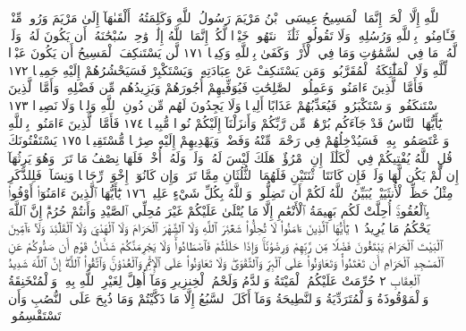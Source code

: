 ٱللَّهِ إِلَّا ٱلْحَقَّۚ إِنَّمَا ٱلْمَسِيحُ عِيسَى ٱبْنُ مَرْيَمَ رَسُولُ ٱللَّهِ
وَكَلِمَتُهُۥٓ أَلْقَىٰهَآ إِلَىٰ مَرْيَمَ وَرُوحࣱ مِّنْهُۖ فَـَٔامِنُوا۟ بِٱللَّهِ
وَرُسُلِهِۦۖ وَلَا تَقُولُوا۟ ثَلَٰثَةٌۚ ٱنتَهُوا۟ خَيْرࣰا لَّكُمْۚ إِنَّمَا ٱللَّهُ
إِلَٰهࣱ وَٰحِدࣱۖ سُبْحَٰنَهُۥٓ أَن يَكُونَ لَهُۥ وَلَدࣱۘ لَّهُۥ مَا فِي ٱلسَّمَٰوَٰتِ
وَمَا فِي ٱلْأَرْضِۗ وَكَفَىٰ بِٱللَّهِ وَكِيلࣰا ١٧١ لَّن يَسْتَنكِفَ
ٱلْمَسِيحُ أَن يَكُونَ عَبْدࣰا لِّلَّهِ وَلَا ٱلْمَلَٰٓئِكَةُ ٱلْمُقَرَّبُونَۚ
وَمَن يَسْتَنكِفْ عَنْ عِبَادَتِهِۦ وَيَسْتَكْبِرْ فَسَيَحْشُرُهُمْ
إِلَيْهِ جَمِيعࣰا ١٧٢ فَأَمَّا ٱلَّذِينَ ءَامَنُوا۟ وَعَمِلُوا۟ ٱلصَّٰلِحَٰتِ
فَيُوَفِّيهِمْ أُجُورَهُمْ وَيَزِيدُهُم مِّن فَضْلِهِۦۖ وَأَمَّا ٱلَّذِينَ
ٱسْتَنكَفُوا۟ وَٱسْتَكْبَرُوا۟ فَيُعَذِّبُهُمْ عَذَابًا أَلِيمࣰا وَلَا
يَجِدُونَ لَهُم مِّن دُونِ ٱللَّهِ وَلِيࣰّا وَلَا نَصِيرࣰا ١٧٣ يَٰٓأَيُّهَا ٱلنَّاسُ
قَدْ جَآءَكُم بُرْهَٰنࣱ مِّن رَّبِّكُمْ وَأَنزَلْنَآ إِلَيْكُمْ نُورࣰا مُّبِينࣰا ١٧٤
فَأَمَّا ٱلَّذِينَ ءَامَنُوا۟ بِٱللَّهِ وَٱعْتَصَمُوا۟ بِهِۦ فَسَيُدْخِلُهُمْ فِي
رَحْمَةࣲ مِّنْهُ وَفَضْلࣲ وَيَهْدِيهِمْ إِلَيْهِ صِرَٰطࣰا مُّسْتَقِيمࣰا ١٧٥
يَسْتَفْتُونَكَ قُلِ ٱللَّهُ يُفْتِيكُمْ فِي ٱلْكَلَٰلَةِۚ إِنِ ٱمْرُؤٌا۟ هَلَكَ
لَيْسَ لَهُۥ وَلَدࣱ وَلَهُۥٓ أُخْتࣱ فَلَهَا نِصْفُ مَا تَرَكَۚ وَهُوَ يَرِثُهَآ إِن
لَّمْ يَكُن لَّهَا وَلَدࣱۚ فَإِن كَانَتَا ٱثْنَتَيْنِ فَلَهُمَا ٱلثُّلُثَانِ مِمَّا تَرَكَۚ
وَإِن كَانُوٓا۟ إِخْوَةࣰ رِّجَالࣰا وَنِسَآءࣰ فَلِلذَّكَرِ مِثْلُ حَظِّ ٱلْأُنثَيَيْنِۗ
يُبَيِّنُ ٱللَّهُ لَكُمْ أَن تَضِلُّوا۟ۗ وَٱللَّهُ بِكُلِّ شَيْءٍ عَلِيمُۢ ١٧٦
يَٰٓأَيُّهَا ٱلَّذِينَ ءَامَنُوٓا۟ أَوْفُوا۟ بِٱلْعُقُودِۚ أُحِلَّتْ لَكُم بَهِيمَةُ ٱلْأَنْعَٰمِ
إِلَّا مَا يُتْلَىٰ عَلَيْكُمْ غَيْرَ مُحِلِّي ٱلصَّيْدِ وَأَنتُمْ حُرُمٌۗ إِنَّ ٱللَّهَ
يَحْكُمُ مَا يُرِيدُ ١ يَٰٓأَيُّهَا ٱلَّذِينَ ءَامَنُوا۟ لَا تُحِلُّوا۟ شَعَٰٓئِرَ ٱللَّهِ
وَلَا ٱلشَّهْرَ ٱلْحَرَامَ وَلَا ٱلْهَدْيَ وَلَا ٱلْقَلَٰٓئِدَ وَلَآ ءَآمِّينَ ٱلْبَيْتَ
ٱلْحَرَامَ يَبْتَغُونَ فَضْلࣰا مِّن رَّبِّهِمْ وَرِضْوَٰنࣰاۚ وَإِذَا حَلَلْتُمْ فَٱصْطَادُوا۟ۚ
وَلَا يَجْرِمَنَّكُمْ شَنَـَٔانُ قَوْمٍ أَن صَدُّوكُمْ عَنِ ٱلْمَسْجِدِ ٱلْحَرَامِ أَن
تَعْتَدُوا۟ۘ وَتَعَاوَنُوا۟ عَلَى ٱلْبِرِّ وَٱلتَّقْوَىٰۖ وَلَا تَعَاوَنُوا۟ عَلَى ٱلْإِثْمِ
وَٱلْعُدْوَٰنِۚ وَٱتَّقُوا۟ ٱللَّهَۖ إِنَّ ٱللَّهَ شَدِيدُ ٱلْعِقَابِ ٢
حُرِّمَتْ عَلَيْكُمُ ٱلْمَيْتَةُ وَٱلدَّمُ وَلَحْمُ ٱلْخِنزِيرِ وَمَآ أُهِلَّ لِغَيْرِ ٱللَّهِ بِهِۦ
وَٱلْمُنْخَنِقَةُ وَٱلْمَوْقُوذَةُ وَٱلْمُتَرَدِّيَةُ وَٱلنَّطِيحَةُ وَمَآ أَكَلَ
ٱلسَّبُعُ إِلَّا مَا ذَكَّيْتُمْ وَمَا ذُبِحَ عَلَى ٱلنُّصُبِ وَأَن تَسْتَقْسِمُوا۟
